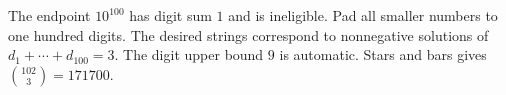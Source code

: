 The endpoint $ 10^{100}$ has digit sum $ 1 $ and is ineligible. Pad all smaller numbers to one hundred digits. The desired strings correspond to nonnegative solutions of $ d_1+\cdots+d_{100}=3 $. The digit upper bound $ 9 $ is automatic. Stars and bars gives $\binom{102}{3}=\boxed{171700}$.
